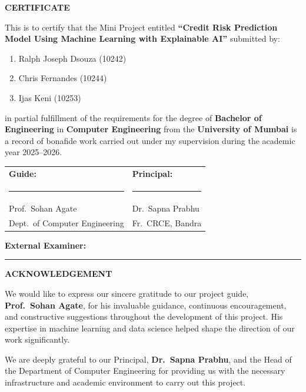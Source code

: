 \documentclass[12pt,a4paper]{report}
\begin{document}
\newpage\thispagestyle{empty}
\begin{center}{\Large\bfseries CERTIFICATE}\\[1cm]\end{center}
This is to certify that the Mini Project entitled \textbf{``Credit Risk Prediction Model Using Machine Learning with Explainable AI''} submitted by:
\begin{enumerate}
\item Ralph Joseph Dsouza (10242)
\item Chris Fernandes (10244)
\item Ijas Keni (10253)
\end{enumerate}
\noindent in partial fulfillment of the requirements for the degree of \textbf{Bachelor of Engineering} in \textbf{Computer Engineering} from the \textbf{University of Mumbai} is a record of bonafide work carried out under my supervision during the academic year 2025--2026.
\vspace{2cm}
\noindent
\begin{tabular}{p{7cm}p{7cm}}
\textbf{Guide:} & \textbf{Principal:} \\[1.5cm]
\rule{5cm}{0.4pt} & \rule{5cm}{0.4pt} \\
Prof.\ Sohan Agate & Dr.\ Sapna Prabhu \\
Dept.\ of Computer Engineering & Fr.\ CRCE, Bandra \\
\end{tabular}
\vspace{2cm}
\noindent\textbf{External Examiner:}\\[1.5cm]
\rule{5cm}{0.4pt}

\newpage\thispagestyle{empty}
\begin{center}{\Large\bfseries ACKNOWLEDGEMENT}\\[1cm]\end{center}
We would like to express our sincere gratitude to our project guide, \textbf{Prof.\ Sohan Agate}, for his invaluable guidance, continuous encouragement, and constructive suggestions throughout the development of this project. His expertise in machine learning and data science helped shape the direction of our work significantly.

We are deeply grateful to our Principal, \textbf{Dr.\ Sapna Prabhu}, and the Head of the Department of Computer Engineering for providing us with the necessary infrastructure and academic environment to carry out this project.
\end{document}
